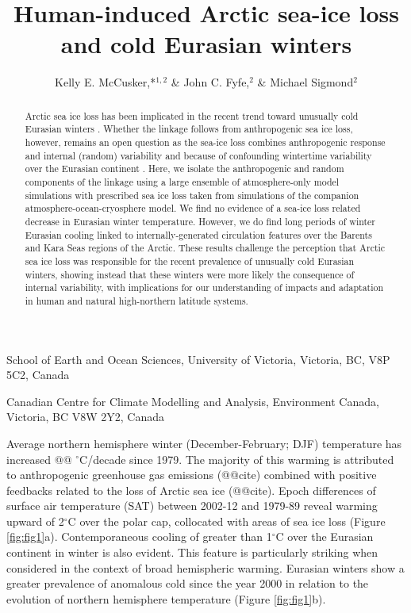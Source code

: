 \documentclass{nature}
\title{Human-induced Arctic sea-ice loss and cold Eurasian winters}
\author{Kelly E. McCusker,*$^{1,2}$ \& John C. Fyfe,$^{2}$ \& Michael Sigmond$^2$}
\begin{document}
\maketitle

\begin{affiliations}
 \item School of Earth and Ocean Sciences, University of Victoria, Victoria, BC, V8P 5C2, Canada
 \item Canadian Centre for Climate Modelling and Analysis, Environment Canada, Victoria, BC V8W 2Y2, Canada
\end{affiliations}


\begin{abstract}
Arctic sea ice loss has been implicated in the recent trend toward unusually cold Eurasian winters \cite{liu12,mori14,kim14}. Whether the linkage follows from anthropogenic sea ice loss, however, remains an open question as the sea-ice loss combines anthropogenic response and internal (random) variability \cite{swart15,wettstein14} and because of confounding wintertime variability over the Eurasian continent \cite{deser12b,screen14a}. Here, we isolate the anthropogenic and random components of the linkage using a large ensemble of atmosphere-only model simulations with prescribed sea ice loss taken from simulations of the companion atmosphere-ocean-cryosphere model. We find no evidence of a sea-ice loss related decrease in Eurasian winter temperature. However, we do find long periods of winter Eurasian cooling linked to internally-generated circulation features over the Barents and Kara Seas regions of the Arctic. These results challenge the perception that Arctic sea ice loss was responsible for the recent prevalence of unusually cold Eurasian winters, showing instead that these winters were more likely the consequence of internal variability, with implications for our understanding of impacts and adaptation in human and natural high-northern latitude systems. %
\end{abstract}

Average northern hemisphere winter (December-February; DJF) temperature has increased @@ $^\circ$C/decade since 1979. The majority of this warming is attributed to anthropogenic greenhouse gas emissions (@@cite) combined with positive feedbacks related to the loss of Arctic sea ice (@@cite). Epoch differences of surface air temperature (SAT) between 2002-12 and 1979-89 reveal warming upward of 2$^\circ$C over the polar cap, collocated with areas of sea ice loss (Figure \ref{fig:fig1}a). Contemporaneous cooling of greater than 1$^\circ$C over the Eurasian continent in winter is also evident. This feature is particularly striking when considered in the context of broad hemispheric warming. Eurasian winters show a greater prevalence of anomalous cold since the year 2000 in relation to the evolution of northern hemisphere temperature (Figure \ref{fig:fig1}b).   
\end{document}
